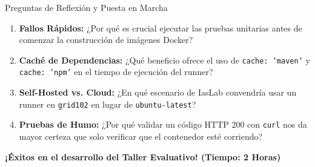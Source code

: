 \documentclass[aspectratio=169]{beamer}
\begin{document}
\begin{frame}{Preguntas de Reflexión y Puesta en Marcha}
  \vspace{0.2cm}
  \begin{enumerate}
    \item \textbf{Fallos Rápidos:} ¿Por qué es crucial ejecutar las pruebas unitarias antes de comenzar la construcción de imágenes Docker?
    \item \textbf{Caché de Dependencias:} ¿Qué beneficio ofrece el uso de \texttt{cache: 'maven'} y \texttt{cache: 'npm'} en el tiempo de ejecución del runner?
    \item \textbf{Self-Hosted vs. Cloud:} ¿En qué escenario de IasLab convendría usar un runner en \texttt{grid102} en lugar de \texttt{ubuntu-latest}?
    \item \textbf{Pruebas de Humo:} ¿Por qué validar un código HTTP 200 con \texttt{curl} nos da mayor certeza que solo verificar que el contenedor esté corriendo?
  \end{enumerate}
  \vspace{0.3cm}
  \centering
  \textbf{\color{cbBlue}¡Éxitos en el desarrollo del Taller Evaluativo! (Tiempo: 2 Horas)}
\end{frame}
\end{document}
